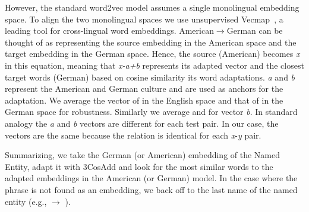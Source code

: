 
However, the standard word2vec model assumes a single monolingual
embedding space.
%
To align the two monolingual spaces we use unsupervised
Vecmap~\citep{artetxe2018robust}, a leading tool for
cross-lingual word embeddings.
%
%
American$\rightarrow$German can be thought of as representing the source embedding in the American space and the target embedding in the German space.
%
Hence, the source (American) becomes \textit{x} in this equation, meaning that \textit{x-a+b} represents its adapted vector and the closest target words (German) based on cosine similarity its word adaptations.
%
\textit{a} and \textit{b} represent the American and German culture and are used as anchors for the adaptation. 
%
We average the vector of  in the English space and that of  in the German space for robustness. 
%
Similarly we average  and  for vector \textit{b}.
%
In standard analogy the \textit{a} and \textit{b} vectors are different for each test pair.  
%
In our case, the vectors are the same because the relation is identical for each \textit{x}-\textit{y} pair.  

Summarizing, we take the German (or American) embedding of the Named Entity, adapt it with 3CosAdd and look for the most similar words to the adapted embeddings in the American (or German) model.
%
In the case where the phrase is not found as an embedding, we back off to the last name of the named entity (e.g.,  $\rightarrow$ ).